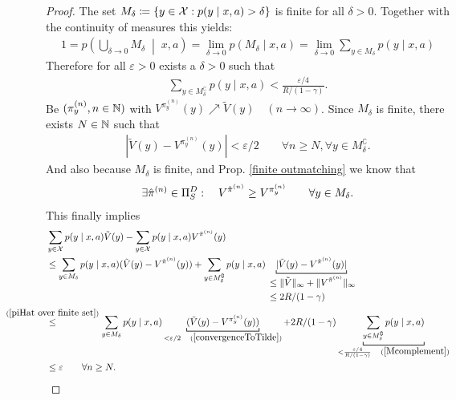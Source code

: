 \begin{proof}
	The set \(M_\delta\coloneqq \{y\in\mathcal{X} : p(y\mid x,a)>\delta \} \) is finite for all \(\delta>0\). Together with the continuity of measures this yields:
	\begin{align*}
		1=p\left(\bigcup_{\delta \to 0} M_\delta \;\middle|\; x, a \right)
		= \lim_{\delta\to 0} p(M_\delta\mid x,a)
		=\lim_{\delta\to 0} \sum_{y\in M_\delta} p(y\mid x,a)
	\end{align*}
	Therefore for all \(\varepsilon >0\) exists a \(\delta>0\) such that
	\begin{align}
		\sum_{y\in M_\delta^\complement}p(y\mid x,a) < \frac{\varepsilon /4}{R/(1-\gamma)}.
		\label{Mcomplement}
	\end{align}
	Be \((\pi_y^{(n)},n\in\mathbb{N} )\) with \(V^{\pi_y^{(n)}}(y) \nearrow \tilde{V}(y) \quad (n\to\infty) \). Since \(M_\delta\) is finite, there exists \(N\in\mathbb{N} \) such that
	\begin{align}
		|\tilde{V}(y) -V^{\pi_y^{(n)}}(y)|< \varepsilon/2
		\qquad \forall n\ge N, \forall y\in M_\delta^\complement.
		\label{convergenceToTilde}
	\end{align}
	And also because \(M_\delta \) is finite, and Prop. \ref{finite outmatching} we know that
	\begin{align}
	\exists\hat{\pi}^{(n)}\in\Pi_S^D : 
	\quad {V^{\hat{\pi}^{(n)}}\ge V^{\pi_y^{(n)}}}
	\qquad \forall y\in M_\delta.
	\label{piHat over finite set}
	\end{align}
	This finally implies
	\begin{align*}
		&\sum_{y\in\cX}p(y\mid x,a)\tilde{V}(y) 
		- \sum_{y\in\cX}p(y\mid x,a) V^{\hat{\pi}^{(n)}}(y) \\
		&\le \sum_{y\in M_\delta}p(y\mid x,a) (\tilde{V}(y) - V^{\hat{\pi}^{(n)}}(y))
		+ \sum_{y\in M_\delta^\complement}p(y\mid x,a) 
		\underbracket[0.7pt]{|\tilde{V}(y) - V^{\hat{\pi}^{(n)}}(y)|}_{
			\begin{aligned}
				&\le \|\tilde{V}\|_\infty + \| V^{\hat{\pi}^{(n)}}\|_\infty\\
				&\le 2R/(1-\gamma)
			\end{aligned}
		} \\
		&\lxlq{(\ref{piHat over finite set})} \sum_{y\in M_\delta}p(y\mid x,a) 
		\underbracket[0.7pt]{(\tilde{V}(y) - V^{\pi_y^{(n)}}(y))}_{
			<\varepsilon/2\quad(\ref{convergenceToTilde})
		}
		+ 2R/(1-\gamma) \underbracket[0.7pt]{\sum_{y\in M_\delta^\complement}p(y\mid x,a)}_{
			< \frac{\varepsilon /4}{R/(1-\gamma)}\quad(\ref{Mcomplement})
		}\\
		&\le \varepsilon \qquad \forall n\ge N.

\end{align*}
\end{proof}
